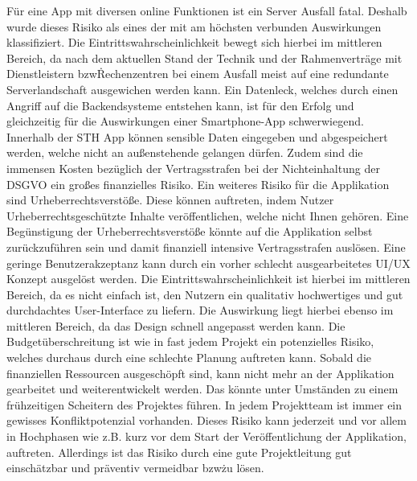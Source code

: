 Für eine App mit diversen online Funktionen ist ein Server Ausfall fatal.
Deshalb wurde dieses Risiko als eines der mit am höchsten verbunden Auswirkungen klassifiziert.
Die Eintrittswahrscheinlichkeit bewegt sich hierbei im mittleren Bereich, da nach dem aktuellen Stand der Technik und der Rahmenverträge mit Dienstleistern bzw\. Rechenzentren bei einem Ausfall meist auf eine redundante Serverlandschaft ausgewichen werden kann.\newline
Ein Datenleck, welches durch einen Angriff auf die Backendsysteme entstehen kann, ist für den Erfolg und gleichzeitig für die Auswirkungen einer Smartphone-App schwerwiegend.
Innerhalb der STH App können sensible Daten eingegeben und abgespeichert werden, welche nicht an außenstehende gelangen dürfen.
Zudem sind die immensen Kosten bezüglich der Vertragsstrafen bei der Nichteinhaltung der DSGVO ein großes finanzielles Risiko.\newline
Ein weiteres Risiko für die Applikation sind Urheberrechtsverstöße.
Diese können auftreten, indem Nutzer Urheberrechtsgeschützte Inhalte veröffentlichen, welche nicht Ihnen gehören.
Eine Begünstigung der Urheberrechtsverstöße könnte auf die Applikation selbst zurückzuführen sein und damit finanziell intensive Vertragsstrafen auslösen.\newline
Eine geringe Benutzerakzeptanz kann durch ein vorher schlecht ausgearbeitetes UI/UX Konzept ausgelöst werden.
Die Eintrittswahrscheinlichkeit ist hierbei im mittleren Bereich, da es nicht einfach ist, den Nutzern ein qualitativ hochwertiges und gut durchdachtes User-Interface zu liefern.
Die Auswirkung liegt hierbei ebenso im mittleren Bereich, da das Design schnell angepasst werden kann.\newline
Die Budgetüberschreitung ist wie in fast jedem Projekt ein potenzielles Risiko, welches durchaus durch eine schlechte Planung auftreten kann.
Sobald die finanziellen Ressourcen ausgeschöpft sind, kann nicht mehr an der Applikation gearbeitet und weiterentwickelt werden.
Das könnte unter Umständen zu einem frühzeitigen Scheitern des Projektes führen.\newline
In jedem Projektteam ist immer ein gewisses Konfliktpotenzial vorhanden.
Dieses Risiko kann jederzeit und vor allem in Hochphasen wie z.B. kurz vor dem Start der Veröffentlichung der Applikation, auftreten.
Allerdings ist das Risiko durch eine gute Projektleitung gut einschätzbar und präventiv vermeidbar bzw\. zu lösen.
